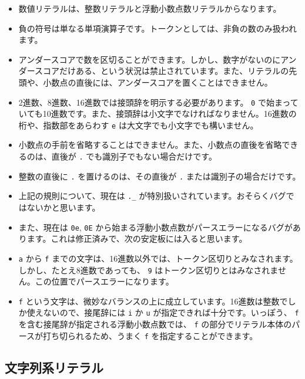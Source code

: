 \documentclass[dvipdfmx,uplatex,papersize,a4paper,10pt]{jsbook}
\theoremstyle{definition}
\begin{document}
\begin{itemize}
  \item 数値リテラルは、整数リテラルと浮動小数点数リテラルからなります。
  \item 負の符号は単なる単項演算子です。トークンとしては、非負の数のみ扱われます。
  \item アンダースコアで数を区切ることができます。しかし、数字がないのにアンダースコアだけある、という状況は禁止されています。また、リテラルの先頭や、小数点の直後には、アンダースコアを置くことはできません。
  \item 2進数、8進数、16進数では接頭辞を明示する必要があります。 \verb|0| で始まっていても10進数です。また、接頭辞は小文字でなければなりません。16進数の桁や、指数部をあらわす \verb|e| は大文字でも小文字でも構いません。
  \item 小数点の手前を省略することはできません。また、小数点の直後を省略できるのは、直後が \verb|.| でも識別子でもない場合だけです。
  \item 整数の直後に \verb|.| を置けるのは、その直後が \verb|.| または識別子の場合だけです。
  \item 上記の規則について、現在は \verb|._| が特別扱いされています。おそらくバグではないかと思います。
  \item また、現在は \verb|0e|, \verb|0E| から始まる浮動小数点数がパースエラーになるバグがあります。これは修正済みで、次の安定板には入ると思います。
  \item \verb|a| から \verb|f| までの文字は、16進数以外では、トークン区切りとみなされます。しかし、たとえ8進数であっても、 \verb|9| はトークン区切りとはみなされません。この位置でパースエラーになります。
  \item \verb|f| という文字は、微妙なバランスの上に成立しています。16進数は整数でしか使えないので、接尾辞には \verb|i| か \verb|u| が指定できれば十分です。いっぽう、 \verb|f| を含む接尾辞が指定される浮動小数点数では、 \verb|f| の部分でリテラル本体のパースが打ち切られるため、うまく \verb|f| を指定することができます。
\end{itemize}

\subsection{文字列系リテラル}
\end{document}
